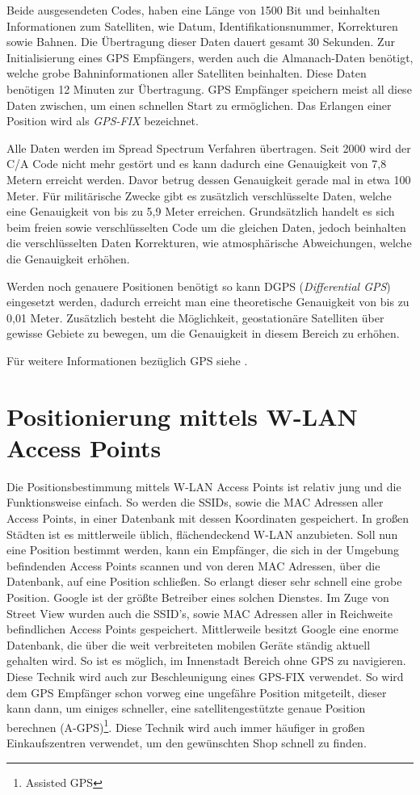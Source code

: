Beide ausgesendeten Codes, haben eine Länge von 1500 Bit und beinhalten Informationen zum  Satelliten, wie Datum, Identifikationsnummer, Korrekturen sowie Bahnen. Die Übertragung dieser Daten dauert gesamt 30 Sekunden. Zur Initialisierung eines GPS Empfängers, werden auch die Almanach-Daten benötigt, welche grobe Bahninformationen aller Satelliten beinhalten. Diese Daten benötigen 12 Minuten zur Übertragung. GPS Empfänger speichern meist all diese Daten zwischen, um einen schnellen Start zu ermöglichen. Das Erlangen einer Position wird als \emph{GPS-FIX} bezeichnet.

Alle Daten werden im Spread Spectrum Verfahren übertragen. Seit 2000 wird der C/A Code nicht mehr gestört und es kann dadurch eine Genauigkeit von 7,8 Metern erreicht werden. Davor betrug dessen Genauigkeit gerade mal in etwa 100 Meter. Für militärische Zwecke gibt es zusätzlich verschlüsselte Daten, welche eine Genauigkeit von bis zu 5,9 Meter erreichen. Grundsätzlich handelt es sich beim freien sowie verschlüsselten Code um die gleichen Daten, jedoch beinhalten die verschlüsselten Daten Korrekturen, wie atmosphärische Abweichungen, welche die Genauigkeit erhöhen.

Werden noch genauere Positionen benötigt so kann DGPS (\emph{Differential GPS}) eingesetzt werden, dadurch erreicht man eine theoretische Genauigkeit von bis zu 0,01 Meter. Zusätzlich besteht die Möglichkeit, geostationäre Satelliten über gewisse Gebiete zu bewegen, um die Genauigkeit in diesem Bereich zu erhöhen.

Für weitere Informationen bezüglich GPS siehe \cite{GPSInfo}.

\section{Positionierung mittels W-LAN Access Points}
Die Positionsbestimmung mittels W-LAN Access Points ist relativ jung und die Funktionsweise einfach. So werden die SSIDs, sowie die MAC Adressen aller Access Points, in einer Datenbank mit dessen Koordinaten gespeichert. In großen Städten ist es mittlerweile üblich, flächendeckend W-LAN anzubieten. Soll nun eine Position bestimmt werden, kann ein Empfänger, die sich in der Umgebung befindenden Access Points scannen und von deren MAC Adressen, über die Datenbank, auf eine Position schließen. So erlangt dieser sehr schnell eine grobe Position. Google ist der größte Betreiber eines solchen Dienstes. Im Zuge von Street View wurden auch die SSID's, sowie MAC Adressen aller in Reichweite befindlichen Access Points gespeichert. Mittlerweile besitzt Google eine enorme Datenbank, die über die weit verbreiteten mobilen Geräte ständig aktuell gehalten wird. So ist es möglich, im Innenstadt Bereich ohne GPS zu navigieren. Diese Technik wird auch zur Beschleunigung eines GPS-FIX verwendet. So wird dem GPS Empfänger schon vorweg eine ungefähre Position mitgeteilt, dieser kann dann, um einiges schneller, eine satellitengestützte genaue Position berechnen (A-GPS)\footnote{Assisted GPS}. Diese Technik wird auch immer häufiger in großen Einkaufszentren verwendet, um den gewünschten Shop schnell zu finden.

